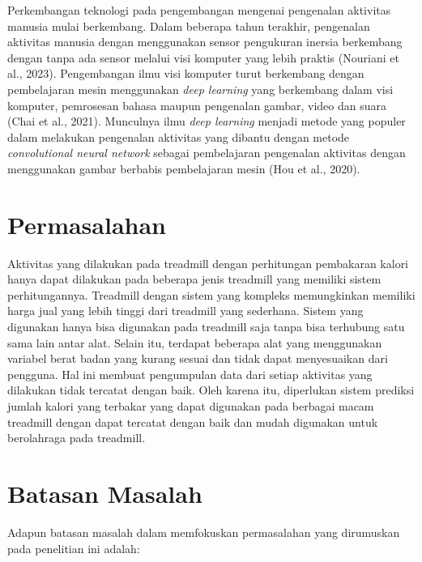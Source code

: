 Perkembangan teknologi pada pengembangan mengenai pengenalan aktivitas manusia mulai berkembang. Dalam beberapa tahun terakhir, pengenalan aktivitas manusia dengan menggunakan sensor pengukuran inersia berkembang dengan tanpa ada sensor melalui visi komputer yang lebih praktis (Nouriani et al., 2023). Pengembangan ilmu visi komputer turut berkembang dengan pembelajaran mesin menggunakan \emph{deep learning} yang berkembang dalam visi komputer, pemrosesan bahasa maupun pengenalan gambar, video dan suara (Chai et al., 2021). Munculnya ilmu \emph{deep learning} menjadi metode yang populer dalam melakukan pengenalan aktivitas yang dibantu dengan metode \emph{convolutional neural network} sebagai pembelajaran pengenalan aktivitas dengan menggunakan gambar berbabis pembelajaran mesin (Hou et al., 2020).


\section{Permasalahan}
\label{sec:permasalahan}

Aktivitas yang dilakukan pada treadmill dengan perhitungan pembakaran kalori hanya dapat dilakukan pada beberapa jenis treadmill yang memiliki sistem perhitungannya. Treadmill dengan sistem yang kompleks memungkinkan memiliki harga jual yang lebih tinggi dari treadmill yang sederhana. Sistem yang digunakan hanya bisa digunakan pada treadmill saja tanpa bisa terhubung satu sama lain antar alat. Selain itu, terdapat beberapa alat yang menggunakan variabel berat badan yang kurang sesuai dan tidak dapat menyesuaikan dari pengguna. Hal ini membuat pengumpulan data dari setiap aktivitas yang dilakukan tidak tercatat dengan baik. Oleh karena itu, diperlukan sistem prediksi jumlah kalori yang terbakar yang dapat digunakan pada berbagai macam treadmill dengan dapat tercatat dengan baik dan mudah digunakan untuk berolahraga pada treadmill. 


\section{Batasan Masalah}
\label{sec:batasanmasalah}

Adapun batasan masalah dalam memfokuskan permasalahan yang dirumuskan pada penelitian ini adalah:


